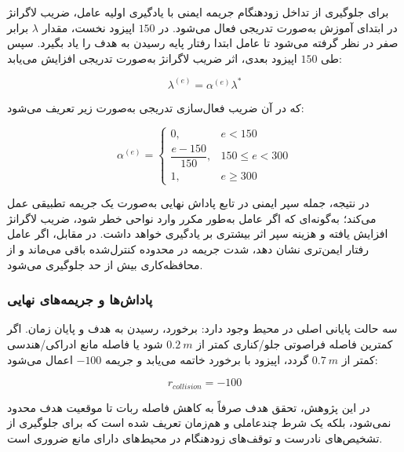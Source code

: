 برای جلوگیری از تداخل زودهنگام جریمه ایمنی با یادگیری اولیه عامل، ضریب لاگرانژ در ابتدای آموزش به‌صورت تدریجی فعال می‌شود. در \(150\) اپیزود نخست، مقدار \(\lambda\) برابر صفر در نظر گرفته می‌شود تا عامل ابتدا رفتار پایه رسیدن به هدف را یاد بگیرد. سپس طی \(150\) اپیزود بعدی، اثر ضریب لاگرانژ به‌صورت تدریجی افزایش می‌یابد:

\begin{equation}
	\lambda^{(e)}
	=
	\alpha^{(e)} \lambda^{*}
	\label{eq:lambda_ramp_final}
\end{equation}

که در آن ضریب فعال‌سازی تدریجی به‌صورت زیر تعریف می‌شود:

\begin{equation}
	\alpha^{(e)}
	=
	\begin{cases}
		0,
		& e < 150\\
		\dfrac{e-150}{150},
		& 150 \le e < 300\\
		1,
		& e \ge 300
	\end{cases}
	\label{eq:lambda_warmup_ramp_final}
\end{equation}

در نتیجه، جمله سپر ایمنی در تابع پاداش نهایی به‌صورت یک جریمه تطبیقی عمل می‌کند؛ به‌گونه‌ای که اگر عامل به‌طور مکرر وارد نواحی خطر شود، ضریب لاگرانژ افزایش یافته و هزینه سپر اثر بیشتری بر یادگیری خواهد داشت. در مقابل، اگر عامل رفتار ایمن‌تری نشان دهد، شدت جریمه در محدوده کنترل‌شده باقی می‌ماند و از محافظه‌کاری بیش از حد جلوگیری می‌شود.

\subsubsection{پاداش‌ها و جریمه‌های نهایی}
\label{subsubsec:terminal_reward_final}

سه حالت پایانی اصلی در محیط وجود دارد: برخورد، رسیدن به هدف و پایان زمان. اگر کمترین فاصله فراصوتی جلو/کناری کمتر از \(0.2~m\) شود یا فاصله مانع ادراکی/هندسی کمتر از \(0.7~m\) گردد، اپیزود با برخورد خاتمه می‌یابد و جریمه \(-100\) اعمال می‌شود:

\begin{equation}
	r_{collision}=-100
	\label{eq:collision_penalty_final}
\end{equation}


در این پژوهش، تحقق هدف صرفاً به کاهش فاصله ربات تا موقعیت هدف محدود نمی‌شود، بلکه یک شرط چندعاملی و هم‌زمان تعریف شده است که برای جلوگیری از تشخیص‌های نادرست و توقف‌های زودهنگام در محیط‌های دارای مانع ضروری است.

